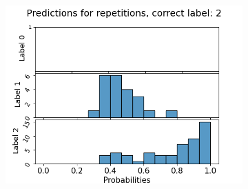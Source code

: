 \begin{figure}
\begin{subfigure}[t]{0.3\textwidth}
    \includegraphics[width=\textwidth]{files/figs/app/hists/femval/pr2.png}
  \end{subfigure}


\end{figure}
